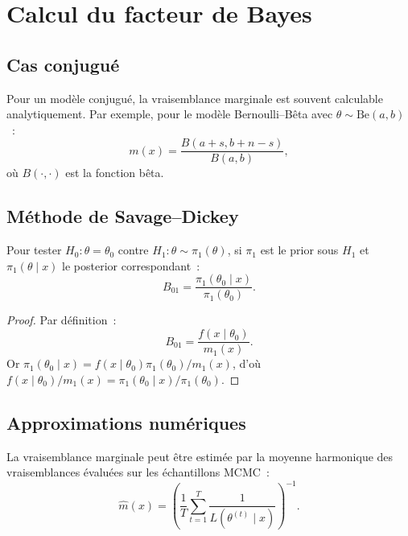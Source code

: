 \section{Calcul du facteur de Bayes}

\subsection{Cas conjugu\'e}

\begin{proposition}
Pour un mod\`ele conjugu\'e, la vraisemblance marginale est souvent
calculable analytiquement. Par exemple, pour le mod\`ele
Bernoulli--B\^eta avec $\theta \sim \text{Be}(a, b)$~:
\[
  m(x) = \frac{B(a + s, b + n - s)}{B(a, b)},
\]
o\`u $B(\cdot, \cdot)$ est la fonction b\^eta.
\end{proposition}

\subsection{M\'ethode de Savage--Dickey}

\begin{theoreme}
Pour tester $H_0 : \theta = \theta_0$ contre
$H_1 : \theta \sim \pi_1(\theta)$, si $\pi_1$ est le prior sous $H_1$
et $\pi_1(\theta \mid x)$ le posterior correspondant~:
\[
  B_{01} = \frac{\pi_1(\theta_0 \mid x)}{\pi_1(\theta_0)}.
\]
\end{theoreme}

\begin{proof}
Par d\'efinition~:
\[
  B_{01} = \frac{f(x \mid \theta_0)}{m_1(x)}.
\]
Or $\pi_1(\theta_0 \mid x) = f(x \mid \theta_0)\pi_1(\theta_0)/m_1(x)$,
d'o\`u $f(x \mid \theta_0)/m_1(x) = \pi_1(\theta_0 \mid x)/\pi_1(\theta_0)$.
\end{proof}

\subsection{Approximations num\'eriques}

\begin{definition}
La vraisemblance marginale peut \^etre estim\'ee par la moyenne harmonique
des vraisemblances \'evalu\'ees sur les \'echantillons MCMC~:
\[
  \hat{m}(x) = \left(\frac{1}{T}\sum_{t=1}^T \frac{1}{L(\theta^{(t)} \mid x)}\right)^{-1}.
\]
\end{definition}

